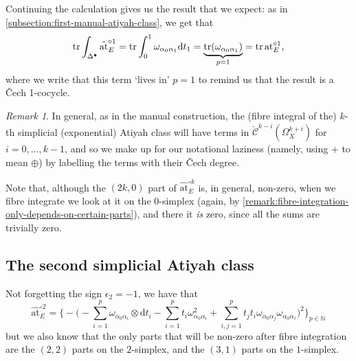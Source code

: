 \documentclass[11pt,fleqn]{article}
\theoremstyle{plain}
\theoremstyle{definition}
\theoremstyle{remark}
\newtheorem{remark}[theorem]{Remark}
\numberwithin{equation}{theorem}
\newcommand{\cech}{\check{\mathscr{C}}}
\newcommand{\at}{\mathrm{at}}
\newcommand{\expat}[1]{\at^{\circ#1}}
\newcommand{\simpexpat}[1]{\hat{\at}^{\circ#1}}
\renewcommand{\d}{\mathrm{d}}
\begin{document}
        Continuing the calculation gives us the result that we expect: as in \cref{subsection:first-manual-atiyah-class}, we get that
        \begin{equation}
            \tr\int_{\Delta^\bullet}\simpexpat{1}_E = \tr\int_0^1\omega_{\alpha_0\alpha_1} \d t_1 = \underbrace{\tr(\omega_{\alpha_0\alpha_1})}_{p=1} = \tr\expat{1}_E,
        \end{equation}
        where we write that this term `lives in' $p=1$ to remind us that the result is a Čech 1-cocycle.

        \begin{remark}
            In general, as in the manual construction, the (fibre integral of the) $k$-th simplicial (exponential) Atiyah class will have terms in $\cech^{k-i}\left(\Omega_X^{k+i}\right)$ for $i=0,\ldots,k-1$, and so we make up for our notational laziness (namely, using $+$ to mean $\oplus$) by labelling the terms with their Čech degree.

            Note that, although the $(2k,0)$ part of $\simpexpat{k}_E$ is, in general, non-zero, when we fibre integrate we look at it on the 0-simplex (again, by \cref{remark:fibre-integration-only-depends-on-certain-parts}), and there it \emph{is} zero, since all the sums are trivially zero.
        \end{remark}


    \subsection{The second simplicial Atiyah class}

        Not forgetting the sign $\epsilon_2=-1$, we have that
        \begin{equation}
            \simpexpat{2}_E = \Bigg\{-\Bigg(-\sum_{i=1}^p\omega_{\alpha_0\alpha_i}\otimes\d t_i - \sum_{i=1}^p t_i\omega_{\alpha_0\alpha_i}^2 + \sum_{i,j=1}^p t_j t_i\omega_{\alpha_0\alpha_j}\omega_{\alpha_0\alpha_i}\Bigg)^2\Bigg\}_{p\in\mathbb{N}}
        \end{equation}
        but we also know that the only parts that will be non-zero after fibre integration are the $(2,2)$ parts on the $2$-simplex, and the $(3,1)$ parts on the $1$-simplex.
\end{document}
